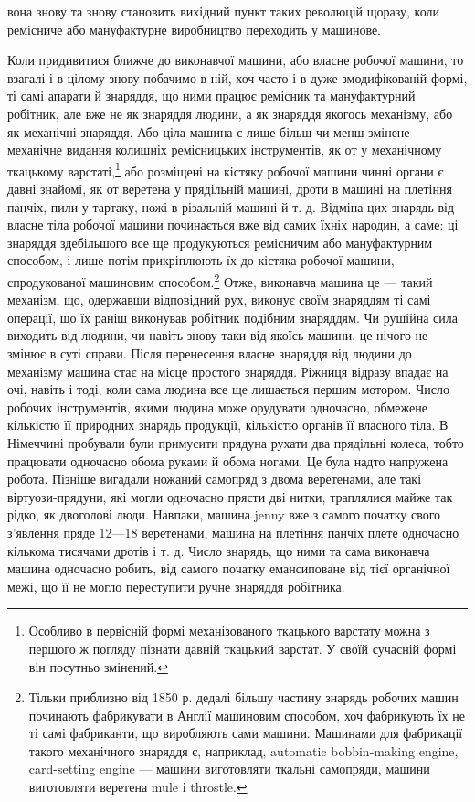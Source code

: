 \parcont{}  %
вона знову та знову становить вихідний пункт таких революцій
щоразу, коли ремісниче або мануфактурне виробництво переходить
у машинове.

Коли придивитися ближче до виконавчої машини, або власне
робочої машини, то взагалі і в цілому знову побачимо в ній, хоч
часто і в дуже змодифікованій формі, ті самі апарати й знаряддя,
що ними працює ремісник та мануфактурний робітник, але
вже не як знаряддя людини, а як знаряддя якогось механізму,
або як механічні знаряддя. Або ціла машина є лише більш
чи менш змінене механічне видання колишніх ремісницьких
інструментів, як от у механічному ткацькому варстаті,\footnote{
Особливо в первісній формі механізованого ткацького варстату
можна з першого ж погляду пізнати давній ткацький варстат. У своїй
сучасній формі він посутньо змінений.
} або
розміщені на кістяку робочої машини чинні органи є давні
знайомі, як от веретена у прядільній машині, дроти в машині
на плетіння панчіх, пили у тартаку, ножі в різальній машині
й т. д. Відміна цих знарядь від власне тіла робочої машини
починається вже від самих їхніх народин, а саме: ці знаряддя
здебільшого все ще продукуються ремісничим або мануфактурним
способом, і лише потім прикріплюють їх до кістяка
робочої машини, спродукованої машиновим способом.\footnote{
Тільки приблизно від 1850 р. дедалі більшу частину знарядь робочих
машин починають фабрикувати в Англії машиновим способом, хоч
фабрикують їх не ті самі фабриканти, що виробляють сами машини.
Машинами для фабрикації такого механічного знаряддя є, наприклад,
automatic bobbin-making engine, card-setting engine — машини виготовляти
ткальні самопряди, машини виготовляти веретена mule і throstle.
} Отже,
виконавча машина це — такий механізм, що, одержавши відповідний
рух, виконує своїм знаряддям ті самі операції, що їх раніш
виконував робітник подібним знаряддям. Чи рушійна сила виходить
від людини, чи навіть знову таки від якоїсь машини, це
нічого не змінює в суті справи. Після перенесення власне знаряддя
від людини до механізму машина стає на місце простого знаряддя.
Ріжниця відразу впадає на очі, навіть і тоді, коли сама людина
все ще лишається першим мотором. Число робочих інструментів,
якими людина може орудувати одночасно, обмежене кількістю
її природних знарядь продукції, кількістю органів її власного
тіла. В Німеччині пробували були примусити прядуна рухати
два прядільні колеса, тобто працювати одночасно обома руками
й обома ногами. Це була надто напружена робота. Пізніше вигадали
ножаний самопряд з двома веретенами, але такі віртуози-прядуни,
які могли одночасно прясти дві нитки, траплялися майже
так рідко, як двоголові люди. Навпаки, машина jenny вже з
самого початку свого з’явлення пряде 12—18 веретенами, машина
на плетіння панчіх плете одночасно кількома тисячами дротів і
т. д. Число знарядь, що ними та сама виконавча машина одночасно
робить, від самого початку емансиповане від тієї органічної
межі, що її не могло переступити ручне знаряддя робітника.
